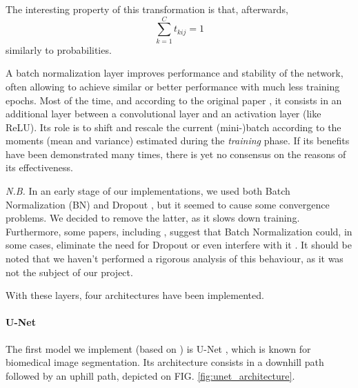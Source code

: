 \documentclass[twocolumn,superscriptaddress,aps,nofootinbib]{revtex4-1}
\begin{document}
\begin{description}[leftmargin=*]
    The interesting property of this transformation is that, afterwards,
    \begin{equation}
        \sum_{k=1}^C t_{kij} = 1
    \end{equation}
    similarly to probabilities.
    \item[Batch normalization] A batch normalization layer improves performance and stability of the network, often allowing to achieve similar or better performance with much less training epochs. Most of the time, and according to the original paper \cite{ioffe2015batch}, it consists in an additional layer between a convolutional layer and an activation layer (like ReLU). Its role is to shift and rescale the current (mini-)batch according to the moments (mean and variance) estimated during the \emph{training} phase. If its benefits have been demonstrated many times, there is yet no consensus on the reasons of its effectiveness.

    \emph{N.B.} In an early stage of our implementations, we used both Batch Normalization (BN) and Dropout \cite{srivastava2014dropout}, but it seemed to cause some convergence problems. We decided to remove the latter, as it slows down training. Furthermore, some papers, including \cite{ioffe2015batch}, suggest that Batch Normalization could, in some cases, eliminate the need for Dropout or even interfere with it \cite{li2019understanding}. It should be noted that we haven't performed a rigorous analysis of this behaviour, as it was not the subject of our project.
\end{description}

With these layers, four architectures have been implemented.

\vspace{1em}

\paragraph{U-Net}

The first model we implement (based on \cite{usuyama2018unet}) is U-Net \cite{ronneberger2015u}, which is known for biomedical image segmentation. Its architecture consists in a downhill path followed by an uphill path, depicted on FIG. \ref{fig:unet_architecture}.
\end{document}
